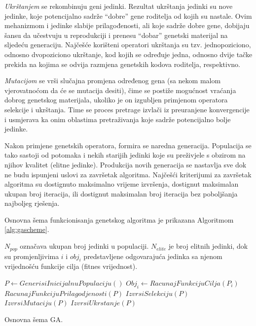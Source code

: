 \documentclass[a4paper, utf8, 11pt, colorlinks]{book}
\theoremstyle{definition}
\begin{document}
\emph{Ukrštanjem} se rekombinuju geni jedinki. Rezultat ukrštanja jedinki su nove jedinke, koje potencijalno sadrže ``dobre'' gene  roditelja od kojih su nastale. Ovim mehanizmom  i jedinke slabije prilagođenosti, ali koje sadrže dobre gene, dobijaju šansu da učestvuju u reprodukciji i prenesu ``dobar'' genetski materijal na sljedeću generaciju. Najčešće korišteni operatori ukrštanja su tzv. jednopoziciono, odnosno dvopoziciono ukrštanje, kod kojih se određuje jedna, odnosno dvije tačke prekida na kojima se odvija razmjena genetskih kodova roditelja, respektivno.

\emph{Mutacijom} se vrši slučajna promjena određenog gena (sa nekom malom vjerovatnoćom da će se mutacija desiti), čime se postiže mogućnost vraćanja dobrog genetskog materijala, ukoliko je on izgubljen primjenom operatora selekcije i ukrštanja. Time se proces pretrage izvlači iz preuranjene konvergencije i usmjerava ka onim oblastima pretraživanja koje sadrže potencijalno bolje jedinke.


Nakon primjene genetskih operatora, formira se naredna generacija. Populacija se tako sastoji od potomaka i nekih starijih jedinki koje su preživjele s obzirom na njihov kvalitet (elitne jedinke). Produkcija novih generacija se nastavlja sve dok ne budu ispunjeni uslovi za završetak algoritma. Najčešći kriterijumi za završetak algoritma su dostignuto maksimalno vrijeme izvršenja, dostignut  maksimalan ukupan broj iteracija, ili dostignut maksimalan broj iteracija bez poboljšanja najboljeg rješenja.

Osnovna šema funkcionisanja genetskog algoritma je prikazana Algoritmom \ref{alg:gascheme}.

$N_{pop}$ označava ukupan broj jedinki u populaciji.  $N_{elite}$ je broj elitnih jedinki, dok su promjenljivima  $i$ i $obj_{i}$ predstavljene odgovarajuća jedinka sa njenom vrijednošću funkcije cilja (fitnes vrijednost).

\begin{algorithm}
	\begin{algorithmic}[1]
		 \STATE  $ P \gets GenerisiInicijalnuPopulaciju()$
		            \STATE $Obj_i \gets RacunajFunkcijuCilja(P_i)$
		       \ENDFOR
		       \STATE $RacunajFunkcijuPrilagodjenosti(P)$
		       \STATE $IzvrsiSelekciju(P)$
		       \STATE $IzvrsiMutaciju(P)$
		       \STATE $IzvrsiUkrstanje(P)$
		 \ENDWHILE
	\end{algorithmic}
    \caption{Osnovna šema GA.}
    \label{alg:gascheme}
\end{algorithm}
\end{document}
